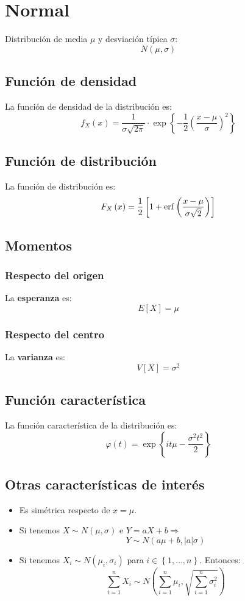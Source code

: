 \section{Normal}
\label{sec:normal}
Distribución de media $\mu$ y desviación típica $\sigma$:
\[
\boxed{N\left( \mu, \sigma \right)}
\]

\subsection{Función de densidad}
La función de densidad de la distribución es:
\[
f_X \left( x \right) = \frac{1}{\sigma \sqrt{2 \pi}} \cdot \exp\left\{ -\frac{1}{2} \left( \frac{x - \mu}{\sigma} \right)^2 \right\}
\]

\subsection{Función de distribución}
La función de distribución es:
\[
F_X\left( x \right) = \frac{1}{2} \left[ 1 + \operatorname{erf}\left( \frac{x - \mu}{\sigma \sqrt{2}} \right) \right]
\]

\subsection{Momentos}

\subsubsection*{Respecto del origen}
La \textbf{esperanza} es: 
\[
    E\left[ X \right] = \mu
\]
\subsubsection*{Respecto del centro}
La \textbf{varianza} es:
\[
    V\left[ X \right] = \sigma^2
\]

\subsection{Función característica}
La función característica de la distribución es:
\[
\varphi\left( t \right) = \exp\left\{ it \mu - \frac{\sigma^2 t^2}{2} \right\}
\]

\subsection{Otras características de interés}
\begin{itemize}
    \item Es simétrica respecto de $x = \mu$.
    \item Si tenemos $X \sim N\left( \mu, \sigma \right)$ e $Y = aX + b \Rightarrow$
    \[
    Y \sim N\left( a \mu + b, \lvert a \rvert \sigma \right)
    \]
    \item Si tenemos $X_i \sim N\left( \mu_i, \sigma_i \right)$ para $i \in \left\{ 1, \ldots, n \right\}$. Entonces: 
    \[
    \sum_{i=1}^{n} X_i \sim N\left( \sum_{i=1}^{n} \mu_i, \sqrt{\sum_{i=1}^{n}
    \sigma_i^2} \right)  
    \]
\end{itemize}

